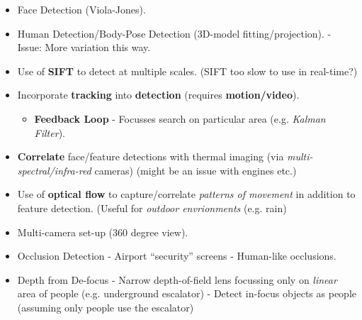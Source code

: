 \documentclass[english, 10pt]{article}
\begin{document}
\begin{itemize}
\item Face Detection (Viola-Jones).
\item Human Detection/Body-Pose Detection (3D-model fitting/projection). - Issue: More variation this way.
\item Use of \textbf{SIFT} to detect at multiple scales. (SIFT too slow to use in real-time?)
\item Incorporate \textbf{tracking} into \textbf{detection} (requires \textbf{motion/video}).
\begin{itemize}
\item \textbf{Feedback Loop} - Focusses search on particular area (e.g. \textit{Kalman Filter}).
\end{itemize}
\item \textbf{Correlate} face/feature detections with thermal imaging (via \textit{multi-spectral/infra-red} cameras) (might be an issue with engines etc.)
\item Use of \textbf{optical flow} to capture/correlate \textit{patterns of movement} in addition to feature detection. (Useful for \textit{outdoor envrionments} (e.g. rain)
\item Multi-camera set-up (360 degree view). 
\item Occlusion Detection - Airport ``security'' screens - Human-like occlusions. 
\item Depth from De-focus - Narrow depth-of-field lens focussing only on \textit{linear} area of people (e.g. underground escalator) - Detect in-focus objects as people (assuming only people use the escalator)

\end{itemize}
\end{document}
